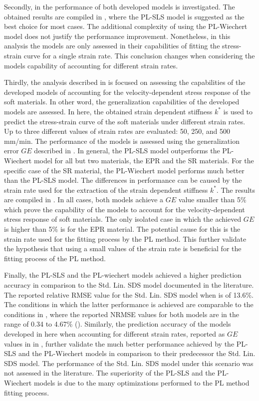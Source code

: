 Secondly, in  the performance of both developed models is investigated. The obtained results are compiled in , where the PL-SLS model is suggested as the best choice for most cases. The additional complexity of using the PL-Wiechert model does not justify the performance improvement. Nonetheless, in this analysis the models are only assessed in their capabilities of fitting the stress-strain curve for a single strain rate. This conclusion changes when considering the models capability of accounting for different strain rates.

Thirdly, the analysis described in  is focused on assessing the capabilities of the developed models of accounting for the velocity-dependent stress response of the soft materials. In other word, the generalization capabilities of the developed models are assessed. In here, the obtained strain dependent stiffness $k^*$ is used to predict the stress-strain curve of the soft materials under different strain rates. Up to three different values of strain rates are evaluated: 50, 250, and 500 mm/min. The performance of the models is assessed using the generalization error $GE$ described in . In general, the PL-SLS model outperforms the PL-Wiechert model for all but two materials, the EPR and the SR materials. For the specific case of the SR material, the PL-Wiechert model performs much better than the PL-SLS model. The differences in performance can be caused by the strain rate used for the extraction of the strain dependent stiffness $k^*$. The results are compiled in . In all cases, both models achieve a $GE$ value smaller than 5\% which prove the capability of the models to account for the velocity-dependent stress response of soft materials. The only isolated case in which the achieved $GE$ is higher than 5\% is for the EPR material. The potential cause for this is the strain rate used for the fitting process by the PL method. This further validate the hypothesis that using a small values of the strain rate is beneficial for the fitting process of the PL method.

Finally, the PL-SLS and the PL-wiechert models achieved a higher prediction accuracy in comparison to the Std. Lin. SDS model documented in the literature. The reported relative RMSE value for the Std. Lin. SDS model when is of 13.6\%. The conditions in which the latter performance is achieved are comparable to the conditions in , where the reported NRMSE values for both models are in the range of 0.34 to 4.67\% (). Similarly, the prediction accuracy of the models developed in here when accounting for different strain rates, reported as $GE$ values in  in , further validate the much better performance achieved by the PL-SLS and the PL-Wiechert models in comparison to their predecessor the Std. Lin. SDS model. The performance of the Std. Lin. SDS model under this scenario was not assessed in the literature. The superiority of the PL-SLS and the PL-Wiechert models is due to the many optimizations performed to the PL method fitting process.

